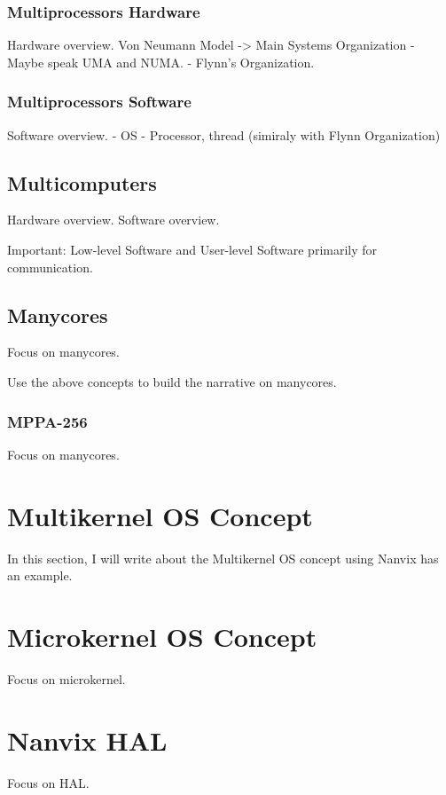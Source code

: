 		\subsubsection{Multiprocessors Hardware}

		Hardware overview.
		Von Neumann Model -> Main Systems Organization
		- Maybe speak UMA and NUMA.
		- Flynn's Organization.

		\subsubsection{Multiprocessors Software}

		Software overview.
		- OS
		- Processor, thread (simiraly with Flynn Organization)


	\subsection{Multicomputers}
		Hardware overview.
		Software overview.

		Important: Low-level Software and User-level Software primarily for communication.

	\subsection{Manycores}
		Focus on manycores.

		Use the above concepts to build the narrative on manycores.

	\subsubsection{MPPA-256}
		Focus on manycores.

\section{Multikernel OS Concept}
	In this section, I will write about the Multikernel OS concept using Nanvix has an example.

\section{Microkernel OS Concept}
	Focus on microkernel.

\section{Nanvix HAL}
	Focus on HAL.